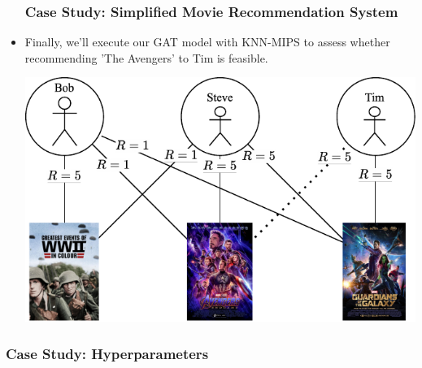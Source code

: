 \documentclass{beamer}
\begin{document}
\begin{frame}[fragile]
\begin{itemize}
\frametitle{Case Study: Simplified Movie Recommendation System}

\item Finally, we'll execute our GAT model with KNN-MIPS to assess whether recommending 'The Avengers' to Tim is feasible.

\vspace{0.5cm}

\begin{minipage}[c]{0.8\textwidth}
    \hspace{1cm}
    \includegraphics[width=\linewidth]{GNN/imgs/RecSysGraphLP.pdf}
\end{minipage}

\end{itemize}
\end{frame}


\begin{frame}[fragile]
\frametitle{Case Study: Hyperparameters}



\end{frame}

\end{document}

